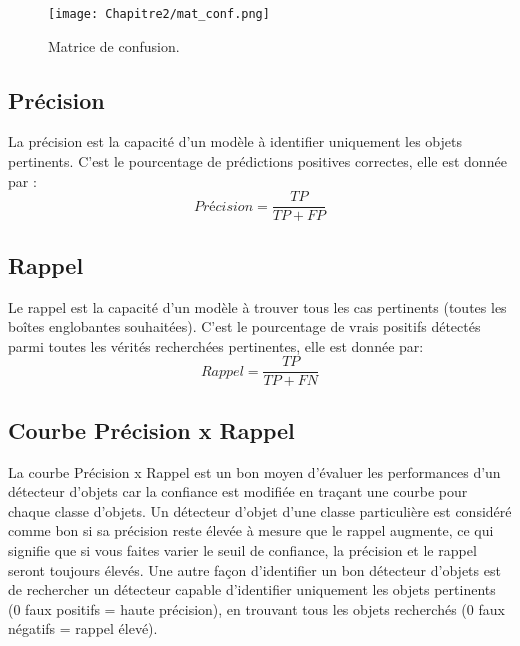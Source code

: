           \begin{figure}[H]
               \centering
               \texttt{[image: Chapitre2/mat\_conf.png]}
               \caption{Matrice de confusion.}
               \label{mat_conf}
               \end{figure}
               
 
          
          \subsection{Précision}
          La précision est la capacité d'un modèle à identifier uniquement les objets pertinents. C'est le pourcentage de prédictions positives correctes,  elle est donnée par :
          \begin{equation}
          Précision = \frac{TP}{TP + FP}
          \end{equation}
          
          \subsection{Rappel}
          Le rappel est la capacité d'un modèle à trouver tous les cas pertinents (toutes les boîtes englobantes souhaitées). C'est le pourcentage de vrais positifs détectés parmi toutes les vérités recherchées pertinentes, elle est donnée par:
          \begin{equation}
          Rappel = \frac{TP}{TP + FN}
          \end{equation}
          
          
          \subsection{Courbe Précision x Rappel }
          La courbe Précision x Rappel est un bon moyen d'évaluer les performances d'un détecteur d'objets car la confiance est modifiée en traçant une courbe pour chaque classe d'objets. Un détecteur d'objet d'une classe particulière est considéré comme bon si sa précision reste élevée à mesure que le rappel augmente, ce qui signifie que si vous faites varier le seuil de confiance, la précision et le rappel seront toujours élevés. Une autre façon d'identifier un bon détecteur d'objets est de rechercher un détecteur capable d'identifier uniquement les objets pertinents (0 faux positifs = haute précision), en trouvant tous les objets recherchés (0 faux négatifs = rappel élevé).
          
